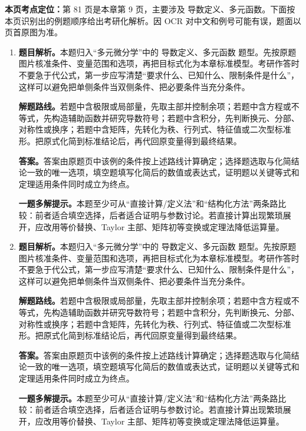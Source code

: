 \begin{solutionblock}
\textbf{本页考点定位：}第 81 页是本章第 9 页，主要涉及 导数定义、多元函数。下面按本页识别出的例题顺序给出考研化解析。因 OCR 对中文和例号可能有误，题面以页首原图为准。

\begin{enumerate}[label=\textbf{例\arabic*.}, leftmargin=2.4em]

\item \textbf{题目解析。}本题归入“多元微分学”中的 导数定义、多元函数 题型。先按原题图片核准条件、变量范围和选项，再把目标式化为本章标准模型。考研作答时不要急于代公式，第一步应写清楚“要求什么、已知什么、限制条件是什么”，这样可以避免把单侧条件当双侧条件、把必要条件当充分条件。

\textbf{解题路线。}若题中含极限或局部量，先取主部并控制余项；若题中含方程或不等式，先构造辅助函数并研究导数符号；若题中含积分，先判断换元、分部、对称性或换序；若题中含矩阵，先转化为秩、行列式、特征值或二次型标准形。把原式化简到标准结论后，再代回原变量得到最终结果。

\textbf{答案。}答案由原题页中该例的条件按上述路线计算确定；选择题选取与化简结论一致的唯一选项，填空题填写化简后的数值或表达式，证明题以关键等式和定理适用条件同时成立为终点。

\textbf{一题多解提示。}本题至少可从“直接计算/定义法”和“结构化方法”两条路比较：前者适合填空选择，后者适合证明与参数讨论。若直接计算出现繁琐展开，应改用等价替换、Taylor 主部、矩阵初等变换或定理法降低运算量。

\item \textbf{题目解析。}本题归入“多元微分学”中的 导数定义、多元函数 题型。先按原题图片核准条件、变量范围和选项，再把目标式化为本章标准模型。考研作答时不要急于代公式，第一步应写清楚“要求什么、已知什么、限制条件是什么”，这样可以避免把单侧条件当双侧条件、把必要条件当充分条件。

\textbf{解题路线。}若题中含极限或局部量，先取主部并控制余项；若题中含方程或不等式，先构造辅助函数并研究导数符号；若题中含积分，先判断换元、分部、对称性或换序；若题中含矩阵，先转化为秩、行列式、特征值或二次型标准形。把原式化简到标准结论后，再代回原变量得到最终结果。

\textbf{答案。}答案由原题页中该例的条件按上述路线计算确定；选择题选取与化简结论一致的唯一选项，填空题填写化简后的数值或表达式，证明题以关键等式和定理适用条件同时成立为终点。

\textbf{一题多解提示。}本题至少可从“直接计算/定义法”和“结构化方法”两条路比较：前者适合填空选择，后者适合证明与参数讨论。若直接计算出现繁琐展开，应改用等价替换、Taylor 主部、矩阵初等变换或定理法降低运算量。

\end{enumerate}
\end{solutionblock}



